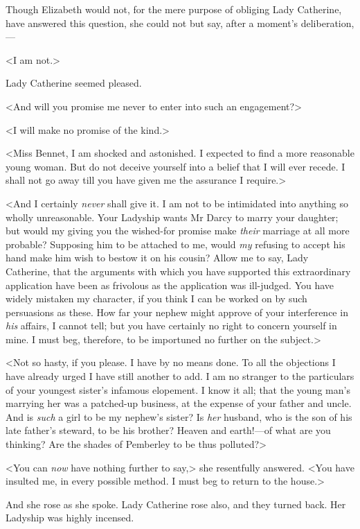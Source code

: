 Though Elizabeth would not, for the mere purpose of obliging Lady Catherine, have answered this question, she could not but say, after a moment's deliberation,—

<I am not.>

Lady Catherine seemed pleased.

<And will you promise me never to enter into such an engagement?>

<I will make no promise of the kind.>

<Miss Bennet, I am shocked and astonished. I expected to find a more reasonable young woman. But do not deceive yourself into a belief that I will ever recede. I shall not go away till you have given me the assurance I require.>

<And I certainly \textit{never} shall give it. I am not to be intimidated into anything so wholly unreasonable. Your Ladyship wants Mr Darcy to marry your daughter; but would my giving you the wished-for promise make \textit{their} marriage at all more probable? Supposing him to be attached to me, would \textit{my} refusing to accept his hand make him wish to bestow it on his cousin? Allow me to say, Lady Catherine, that the arguments with which you have supported this extraordinary application have been as frivolous as the application was ill-judged. You have widely mistaken my character, if you think I can be worked on by such persuasions as these. How far your nephew might approve of your interference in \textit{his} affairs, I cannot tell; but you have certainly no right to concern yourself in mine. I must beg, therefore, to be importuned no further on the subject.>

<Not so hasty, if you please. I have by no means done. To all the objections I have already urged I have still another to add. I am no stranger to the particulars of your youngest sister's infamous elopement. I know it all; that the young man's marrying her was a patched-up business, at the expense of your father and uncle. And is \textit{such} a girl to be my nephew's sister? Is \textit{her} husband, who is the son of his late father's steward, to be his brother? Heaven and earth!—of what are you thinking? Are the shades of Pemberley to be thus polluted?>

<You can \textit{now} have nothing further to say,> she resentfully answered. <You have insulted me, in every possible method. I must beg to return to the house.>

And she rose as she spoke. Lady Catherine rose also, and they turned back. Her Ladyship was highly incensed.

